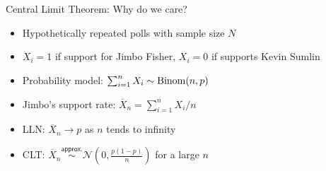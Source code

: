 \documentclass[presentation]{beamer}
\begin{document}
\begin{frame}[label={sec:org5dcd460}]{Central Limit Theorem: Why do we care?}
\begin{itemize}
\item Hypothetically repeated polls with sample size \(N\)
\item \(X_i = 1\) if support for Jimbo Fisher, \(X_i = 0\) if supports Kevin Sumlin
\item Probability model: \(\sum_{i=1}^n X_i \sim {\rm Binom}(n, p)\)
\end{itemize}

\pause

\begin{itemize}
\item Jimbo's support rate: \(\overline{X}_n = \sum_{i=1}^n X_i/n\)
\item \alert{LLN}: \(\overline{X}_n \longrightarrow p\) as \(n\) tends to infinity
\item \alert{CLT}: \(\overline{X}_n
    \stackrel{\textsf{approx.}}{\sim}\mathcal{N}\left(0,
      \frac{p(1-p)}{n}\right)\) for a large \(n\)
\end{itemize}
\end{frame}
\end{document}
